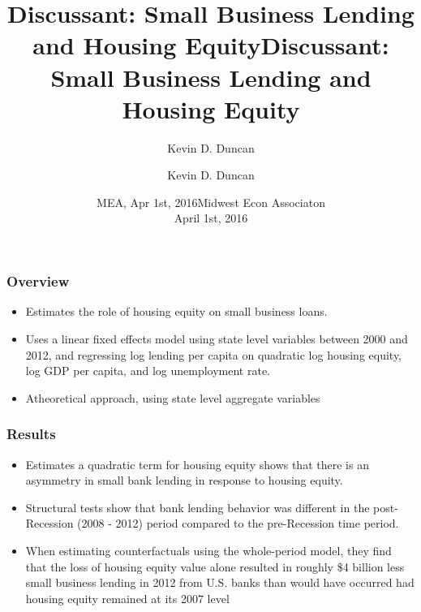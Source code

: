 \documentclass{beamer}
\title{Discussant: Small Business Lending and Housing Equity}
\author{Kevin D. Duncan}
\institute{Iowa State University}
\date{MEA, Apr 1st, 2016}
\begin{document}
\begin{frame}

\title{Discussant: Small Business Lending and Housing Equity}
\author{Kevin D. Duncan}
\date{Midwest Econ Associaton \\ April 1st, 2016}
\maketitle
\end{frame}

\begin{frame}
\frametitle{Overview}
\begin{itemize}
\item Estimates the role of housing equity on small business loans. 
\item Uses a linear fixed effects model using state level variables between 2000 and 2012, and regressing log lending per capita on quadratic log housing equity, log GDP per capita, and log unemployment rate.
\item Atheoretical approach, using state level aggregate variables
\end{itemize}
\end{frame}

\begin{frame}
\frametitle{Results}
\begin{itemize}
\item Estimates a quadratic term for housing equity shows that there is an asymmetry in small bank lending in response to housing equity.
\item Structural tests show that bank lending behavior was different in the post-Recession (2008 - 2012) period compared to the pre-Recession time period.
\item When estimating counterfactuals using the whole-period model, they find that the
loss of housing equity value alone resulted in roughly \$4 billion less small business lending in
2012 from U.S. banks than would have occurred had housing equity remained at its 2007 level
\end{itemize}
\end{frame}
\end{document}
